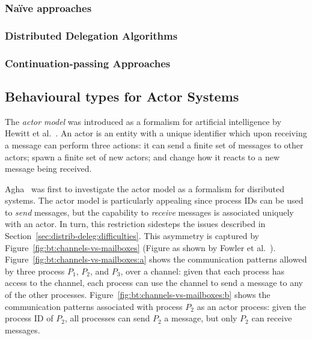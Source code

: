 \documentclass[
graybox,
envcountchap
]{svmult}
\begin{document}
\begin{bibunit}
  \subsubsection{Na\"ive approaches}
  \subsubsection{Distributed Delegation Algorithms}

  \subsubsection{Continuation-passing Approaches}

  \subsection{Behavioural types for Actor Systems}
  The \emph{actor model} was introduced as a formalism for artificial
  intelligence by Hewitt et al.~\cite{HewittBS73:actors}. An actor is an entity with a
  unique identifier which upon receiving a message can perform
  three actions: it can send a finite set of messages to other actors; spawn a
  finite set of new actors; and change how it reacts to a new message being
  received.

  

  Agha~\cite{Agha90:actors} was first to investigate the actor model as a formalism
  for disributed systems. The actor model is particularly appealing since
  process IDs can be used to \emph{send} messages, but the capability to
  \emph{receive} messages is associated uniquely with an actor. In turn, this
  restriction sidesteps the issues described in
  Section~\ref{sec:distrib-deleg:difficulties}.
  This asymmetry is captured by Figure~\ref{fig:bt:channels-vs-mailboxes} (Figure
  as shown by Fowler et al.~\cite{FowlerLW17:mm}). Figure~\ref{fig:bt:channels-vs-mailboxes:a}
  shows the communication patterns allowed by three process $P_1$, $P_2$, and
  $P_3$, over a channel: given that each process has access to the channel,
  each process can use the channel to send a message to any of the other
  processes. Figure~\ref{fig:bt:channels-vs-mailboxes:b} shows the communication
  patterns associated with process $P_2$ as an actor process: given the process
  ID of $P_2$, all processes can send $P_2$ a message, but only $P_2$ can
  receive messages.


\end{bibunit}
\end{document}
